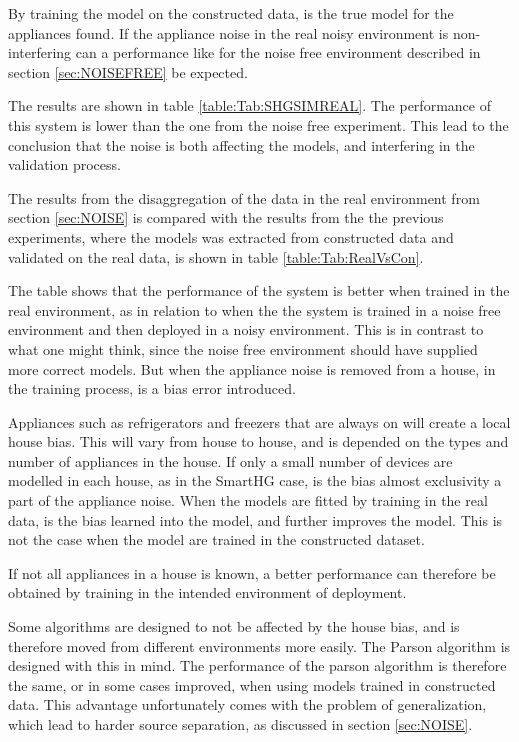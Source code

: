By training the model on the constructed data, is the true model for the appliances found. If the appliance noise in the real noisy environment is non-interfering can a performance like for the noise free environment described in section \ref{sec:NOISEFREE} be expected. 




The results are shown in table \ref{table:Tab:SHGSIMREAL}. The performance of this system is lower than the one from the noise free experiment. This lead to the conclusion that the noise is both affecting the models, and interfering in the validation process.  

The results from the disaggregation of the data in the real environment from section \ref{sec:NOISE} is compared with the results from the the previous experiments, where the models was extracted from constructed data and validated on the real data, is shown in table \ref{table:Tab:RealVsCon}. 



The table shows that the performance of the system is better when trained in the real environment, as in relation to when the the system is trained in a noise free environment and then deployed in a noisy environment. This is in contrast to what one might think, since the noise free environment should have supplied more correct models. But when the appliance noise is removed from a house, in the training process, is a bias error introduced. 

Appliances such as refrigerators and freezers that are always on will create a local house bias. This will vary from house to house, and is depended on the types and number of appliances in the house. If only a small number of devices are modelled in each house, as in the SmartHG case, is the bias almost exclusivity a part of the appliance noise. When the models are fitted by training in the real data, is the bias learned into the model, and further improves the model. This is not the case when the model are trained in the constructed dataset. 

If not all appliances in a house is known, a better performance can therefore be obtained by training in the intended environment of deployment. 

Some algorithms are designed to not be affected by the house bias, and is therefore moved from different environments more easily. The Parson algorithm is designed with this in mind. The performance of the parson algorithm is therefore the same, or in some cases improved, when using models trained in constructed data. This advantage unfortunately comes with the problem of generalization, which lead to harder source separation, as discussed in section \ref{sec:NOISE}. 

